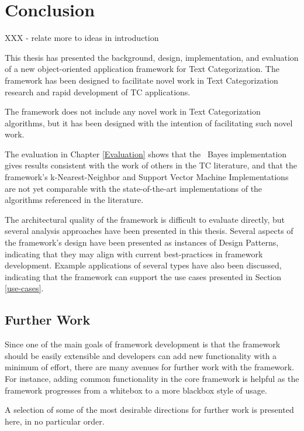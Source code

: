 \chapter{Conclusion}
\label{Conclusion}

XXX - relate more to ideas in introduction

This thesis has presented the background, design, implementation, and
evaluation of a new object-oriented application framework for Text
Categorization.  The framework has been designed to facilitate novel
work in Text Categorization research and rapid development of TC
applications.

The framework does not include any novel work in Text
Categorization algorithms, but it has been designed with the intention
of facilitating such novel work.

The evaluation in Chapter \ref{Evaluation} shows that the \naive\
Bayes implementation gives results consistent with the work of others
in the TC literature, and that the framework's k-Nearest-Neighbor and
Support Vector Machine Implementations are not yet comparable with the
state-of-the-art implementations of the algorithms referenced in the
literature.

The architectural quality of the framework is difficult to evaluate
directly, but several analysis approaches have been presented in this
thesis.  Several aspects of the framework's design have been presented
as instances of Design Patterns, indicating that they may align with
current best-practices in framework development.  Example applications
of several types have also been discussed, indicating that the
framework can support the use cases presented in Section
\ref{use-cases}.

\section{Further Work}

Since one of the main goals of framework development is that the
framework should be easily extensible and developers can add new
functionality with a minimum of effort, there are many avenues for
further work with the framework.  For instance, adding common
functionality in the core framework is helpful as the framework
progresses from a whitebox to a more blackbox style of usage.

A selection of some of the most desirable directions for further work
is presented here, in no particular order.

